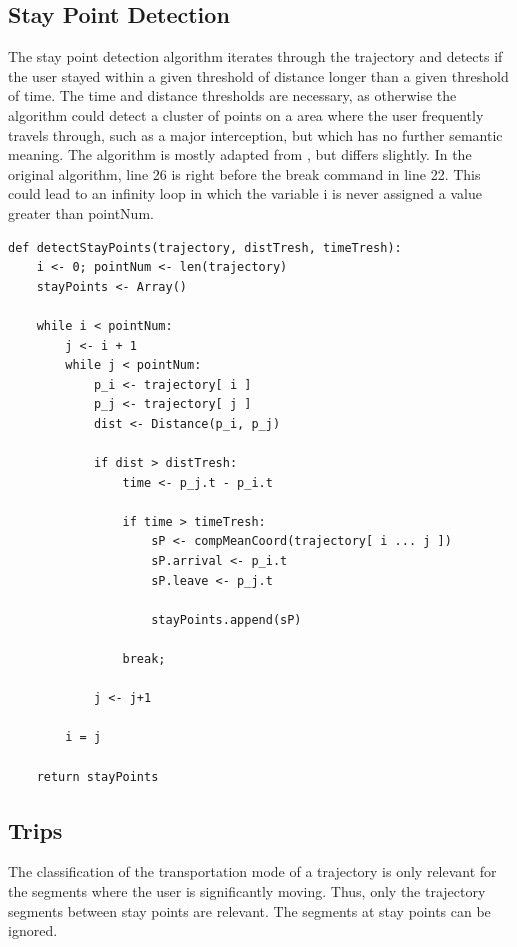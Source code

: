 \subsection{Stay Point Detection}

The stay point detection algorithm iterates through the trajectory and detects if the user stayed within a given threshold of distance longer than a given threshold of time. The time and distance thresholds are necessary, as otherwise the algorithm could detect a cluster of points on a area where the user frequently travels through, such as a major interception, but which has no further semantic meaning. The algorithm is mostly adapted from \cite{li2008mining}, but differs slightly. In the original algorithm, line 26 is right before the break command in line 22. This could lead to an infinity loop in which the variable i is never assigned a value greater than pointNum. \cite{li2008mining}

\begin{lstlisting}[style=py, caption={Pseudocode: Stay Point Detection \cite{li2008mining}}, label={code:stayPoint}]
def detectStayPoints(trajectory, distTresh, timeTresh):
    i <- 0; pointNum <- len(trajectory)
    stayPoints <- Array()
    
    while i < pointNum:
        j <- i + 1
        while j < pointNum:
            p_i <- trajectory[ i ]
            p_j <- trajectory[ j ]
            dist <- Distance(p_i, p_j)
            
            if dist > distTresh:
                time <- p_j.t - p_i.t
                
                if time > timeTresh:
                    sP <- compMeanCoord(trajectory[ i ... j ])
                    sP.arrival <- p_i.t
                    sP.leave <- p_j.t
                    
                    stayPoints.append(sP)
                
                break;
            
            j <- j+1
        
        i = j
    
    return stayPoints
\end{lstlisting}


\subsection{Trips}
The classification of the transportation mode of a trajectory is only relevant for the segments where the user is significantly moving. Thus, only the trajectory segments between stay points are relevant. The segments at stay points can be ignored.

